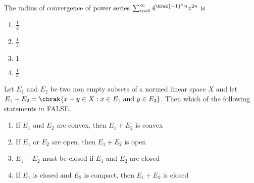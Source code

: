 \item{
The radius of convergence of power series $\sum_{n=0}^{\infty}4^{\brak{-1}^nn}z^{2n}$ is 
\begin{multicols}{4}
\begin{enumerate}
\item $\frac{1}{4}$
\item $\frac{1}{2}$
\item $1$
\item $\frac{1}{3}$
\end{enumerate}
\end{multicols}
}
\item{
Let $E_1$ and $E_2$ be two non empty subsets of a normed linear space $X$ and let $E_1+E_2=\cbrak{x+y\in X:x\in E_1\text{ and }y\in E_2}$. Then which of the following statements in FALSE.
\begin{enumerate}
    \item If $E_1$ and $E_2$ are convex, then $E_1+E_2$ is convex
    \item If $E_1$ or $E_2$ are open, then $E_1+E_2$ is open
    \item $E_1+E_2$ must be closed if $E_1$ and $E_2$ are closed
    \item If $E_1$ is closed and $E_2$ is compact, then $E_1+E_2$ is closed
\end{enumerate}
}
